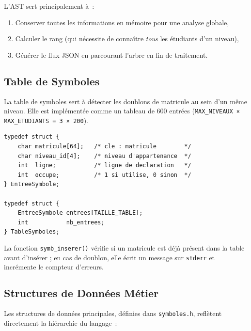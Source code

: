 \documentclass[a4paper,12pt]{article}
\begin{document}
L'AST sert principalement à~:
\begin{enumerate}[leftmargin=1.5em]
  \item Conserver toutes les informations en mémoire pour une analyse globale,
  \item Calculer le rang (qui nécessite de connaître \textit{tous} les étudiants d'un niveau),
  \item Générer le flux JSON en parcourant l'arbre en fin de traitement.
\end{enumerate}

\subsection{Table de Symboles}

La table de symboles sert à détecter les doublons de matricule au sein d'un même niveau. Elle est implémentée comme un tableau de 600 entrées (\texttt{MAX\_NIVEAUX × MAX\_ETUDIANTS = 3 × 200}).

\begin{lstlisting}[caption={Structure de la table de symboles dans symboles.h}, style=c, label=lst:table-symboles]
typedef struct {
    char matricule[64];   /* cle : matricule        */
    char niveau_id[4];    /* niveau d'appartenance  */
    int  ligne;           /* ligne de declaration   */
    int  occupe;          /* 1 si utilise, 0 sinon  */
} EntreeSymbole;

typedef struct {
    EntreeSymbole entrees[TAILLE_TABLE];
    int           nb_entrees;
} TableSymboles;
\end{lstlisting}

La fonction \texttt{symb\_inserer()} vérifie si un matricule est déjà présent dans la table avant d'insérer ; en cas de doublon, elle écrit un message sur \texttt{stderr} et incrémente le compteur d'erreurs.

\subsection{Structures de Données Métier}

Les structures de données principales, définies dans \texttt{symboles.h}, reflètent directement la hiérarchie du langage~:
\end{document}
